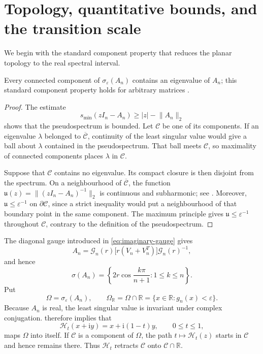 \documentclass[review,hidelinks,onefignum,onetabnum]{siamart251216}
\newcommand{\R}{\mathbb R}
\newcommand{\ii}{\mathrm i}
\begin{document}
\section{Topology, quantitative bounds, and the transition scale}
\label{sec:topology-bounds}

We begin with the standard component property that reduces the planar
topology to the real spectral interval.

\begin{lemma}\label{lem:component}
Every connected component of \(\sigma_\varepsilon(A_n)\) contains an
eigenvalue of \(A_n\); this standard component property holds for
arbitrary matrices \cite{BurkeLewisOverton2003}.
\end{lemma}

\begin{proof}
The estimate
\[
 s_{\min}(zI_n-A_n)\geq |z|-\lVert A_n\rVert_2
\]
shows that the pseudospectrum is bounded.  Let \(\mathcal C\) be one of
its components.  If an eigenvalue \(\lambda\) belonged to
\(\overline{\mathcal C}\), continuity of the least singular value would
give a ball about \(\lambda\) contained in the pseudospectrum.  That
ball meets \(\mathcal C\), so maximality of connected components places
\(\lambda\) in \(\mathcal C\).

Suppose that \(\mathcal C\) contains no eigenvalue.  Its compact closure
is then disjoint from the spectrum.  On a neighbourhood of
\(\overline{\mathcal C}\), the function
\(\mathfrak u(z)=\lVert(zI_n-A_n)^{-1}\rVert_2\) is continuous and
subharmonic; see
\cite{TrefethenEmbree2005}.  Moreover,
\(\mathfrak u\leq\varepsilon^{-1}\) on \(\partial\mathcal C\), since a strict
inequality would put a neighbourhood of that boundary point in the same
component.  The maximum principle gives
\(\mathfrak u\leq\varepsilon^{-1}\) throughout \(\mathcal C\), contrary to the
definition of the pseudospectrum.
\end{proof}

The diagonal gauge introduced in \eqref{eq:imaginary-gauge} gives
\[
 A_n=\mathcal G_n(r)\bigl[r(V_n+V_n^T)\bigr]
 \mathcal G_n(r)^{-1},
\]
and hence
\begin{equation}\label{eq:spectrum}
 \sigma(A_n)=\left\{2r\cos\frac{k\pi}{n+1}:1\leq k\leq n\right\}.
\end{equation}
Put
\[
 \Omega=\sigma_\varepsilon(A_n),\qquad
 \Omega_\R=\Omega\cap\R=\{x\in\R:g_n(x)<\varepsilon\}.
\]
Because \(A_n\) is real, the least singular value is invariant under
complex conjugation.   therefore implies that
\[
 \mathcal H_t(x+\ii y)=x+\ii(1-t)y,\qquad0\leq t\leq1,
\]
maps \(\Omega\) into itself.  If \(\mathcal C\) is a component of
\(\Omega\), the path \(t\mapsto\mathcal H_t(z)\) starts in
\(\mathcal C\) and hence remains there.  Thus \(\mathcal H_t\) retracts
\(\mathcal C\) onto
\(\mathcal C\cap\R\).
\end{document}
